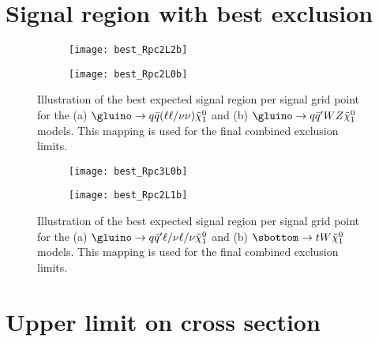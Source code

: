 \section{Signal region with best exclusion}
\label{app:aux.bestSR}

\begin{figure}[htb!]
\centering
\begin{subfigure}[t]{0.49\textwidth}\texttt{[image: best\_Rpc2L2b]}\caption{}\label{fig:best_Rpc2L2b}\end{subfigure}
\begin{subfigure}[t]{0.49\textwidth}\texttt{[image: best\_Rpc2L0b]}\caption{}\label{fig:best_Rpc2L0b}\end{subfigure}
\caption{Illustration of the best expected signal region per signal grid point for the (a)  
$\gluino\to q\bar q (\ell\ell/\nu\nu)\tilde\chi^0_1$ and (b) $\gluino\to q\bar q' WZ\tilde\chi^0_1$ models. 
This mapping is used for the final combined exclusion limits.}
\label{fig:best_SR1}
\end{figure}

\begin{figure}[htb!]
\centering
\begin{subfigure}[t]{0.49\textwidth}\texttt{[image: best\_Rpc3L0b]}\caption{}\label{fig:best_Rpc3L0b}\end{subfigure}
\begin{subfigure}[t]{0.49\textwidth}\texttt{[image: best\_Rpc2L1b]}\caption{}\label{fig:best_Rpc2L1b}\end{subfigure}
\caption{Illustration of the best expected signal region per signal grid point for the 
(a) $\gluino\to q\bar q' \ell/\nu \ell/\nu \tilde\chi^0_1$ and (b) $\sbottom\to t W \tilde\chi^0_1$ models. 
This mapping is used for the final combined exclusion limits.}
\label{fig:best_SR2}
\end{figure}

\newpage

\section{Upper limit on cross section}
\label{app:aux.ULcs}

